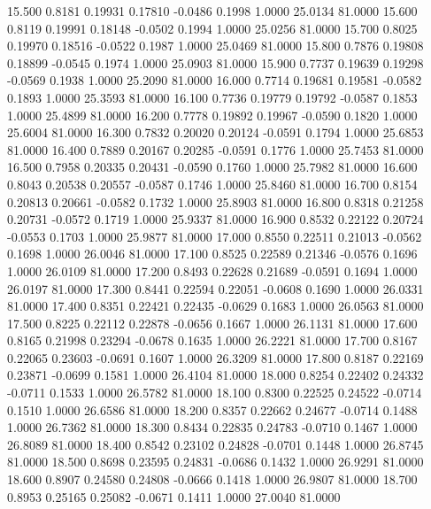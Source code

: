   15.500   0.8181   0.19931   0.17810  -0.0486   0.1998   1.0000  25.0134  81.0000
  15.600   0.8119   0.19991   0.18148  -0.0502   0.1994   1.0000  25.0256  81.0000
  15.700   0.8025   0.19970   0.18516  -0.0522   0.1987   1.0000  25.0469  81.0000
  15.800   0.7876   0.19808   0.18899  -0.0545   0.1974   1.0000  25.0903  81.0000
  15.900   0.7737   0.19639   0.19298  -0.0569   0.1938   1.0000  25.2090  81.0000
  16.000   0.7714   0.19681   0.19581  -0.0582   0.1893   1.0000  25.3593  81.0000
  16.100   0.7736   0.19779   0.19792  -0.0587   0.1853   1.0000  25.4899  81.0000
  16.200   0.7778   0.19892   0.19967  -0.0590   0.1820   1.0000  25.6004  81.0000
  16.300   0.7832   0.20020   0.20124  -0.0591   0.1794   1.0000  25.6853  81.0000
  16.400   0.7889   0.20167   0.20285  -0.0591   0.1776   1.0000  25.7453  81.0000
  16.500   0.7958   0.20335   0.20431  -0.0590   0.1760   1.0000  25.7982  81.0000
  16.600   0.8043   0.20538   0.20557  -0.0587   0.1746   1.0000  25.8460  81.0000
  16.700   0.8154   0.20813   0.20661  -0.0582   0.1732   1.0000  25.8903  81.0000
  16.800   0.8318   0.21258   0.20731  -0.0572   0.1719   1.0000  25.9337  81.0000
  16.900   0.8532   0.22122   0.20724  -0.0553   0.1703   1.0000  25.9877  81.0000
  17.000   0.8550   0.22511   0.21013  -0.0562   0.1698   1.0000  26.0046  81.0000
  17.100   0.8525   0.22589   0.21346  -0.0576   0.1696   1.0000  26.0109  81.0000
  17.200   0.8493   0.22628   0.21689  -0.0591   0.1694   1.0000  26.0197  81.0000
  17.300   0.8441   0.22594   0.22051  -0.0608   0.1690   1.0000  26.0331  81.0000
  17.400   0.8351   0.22421   0.22435  -0.0629   0.1683   1.0000  26.0563  81.0000
  17.500   0.8225   0.22112   0.22878  -0.0656   0.1667   1.0000  26.1131  81.0000
  17.600   0.8165   0.21998   0.23294  -0.0678   0.1635   1.0000  26.2221  81.0000
  17.700   0.8167   0.22065   0.23603  -0.0691   0.1607   1.0000  26.3209  81.0000
  17.800   0.8187   0.22169   0.23871  -0.0699   0.1581   1.0000  26.4104  81.0000
  18.000   0.8254   0.22402   0.24332  -0.0711   0.1533   1.0000  26.5782  81.0000
  18.100   0.8300   0.22525   0.24522  -0.0714   0.1510   1.0000  26.6586  81.0000
  18.200   0.8357   0.22662   0.24677  -0.0714   0.1488   1.0000  26.7362  81.0000
  18.300   0.8434   0.22835   0.24783  -0.0710   0.1467   1.0000  26.8089  81.0000
  18.400   0.8542   0.23102   0.24828  -0.0701   0.1448   1.0000  26.8745  81.0000
  18.500   0.8698   0.23595   0.24831  -0.0686   0.1432   1.0000  26.9291  81.0000
  18.600   0.8907   0.24580   0.24808  -0.0666   0.1418   1.0000  26.9807  81.0000
  18.700   0.8953   0.25165   0.25082  -0.0671   0.1411   1.0000  27.0040  81.0000
